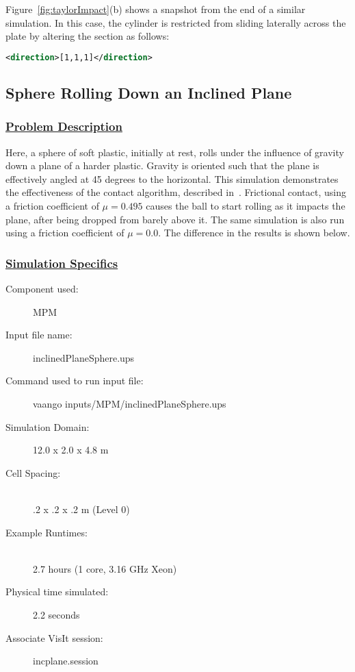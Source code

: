 Figure~\ref{fig:taylorImpact}(b) shows a snapshot from the end of a
similar simulation.  In this case, the cylinder is restricted from sliding
laterally across the plate by altering the 
section as follows:
\begin{lstlisting}[language=XML]
        <direction>[1,1,1]</direction>
\end{lstlisting}

\newpage
\subsection*{\center Sphere Rolling Down an Inclined Plane}
\subsubsection*{\underline{Problem Description}}
Here, a sphere of soft plastic, initially at rest, rolls under the
influence of gravity down a plane of a harder plastic.  Gravity is
oriented such that the plane is effectively angled at 45 degrees to
the horizontal.  This simulation demonstrates the effectiveness of
the contact algorithm, described in~\cite{Bard2001}.  Frictional
contact, using a friction coefficient of $\mu = 0.495$ causes the ball
to start rolling as it impacts the plane, after being dropped from
barely above it.  The same simulation is also run using a friction
coefficient of $\mu = 0.0$.  The difference in the results is shown
below.
 
\subsubsection*{\underline{Simulation Specifics}}
\begin{description} 
\item [Component used:] \hfill MPM
\item [Input file name:] \hfill inclinedPlaneSphere.ups
\item [Command used to run input file:]\hfill vaango inputs/MPM/inclinedPlaneSphere.ups
\item [Simulation Domain:]\hfill    12.0 x 2.0 x 4.8 m

\item [Cell Spacing:]\hfill \\ 
.2 x .2 x .2 m (Level 0)

\item [Example Runtimes:] \hfill \\
 2.7 hours  (1 core, 3.16 GHz Xeon)\\

\item [Physical time simulated:] \hfill 2.2 seconds

\item [Associate VisIt session:] \hfill incplane.session

\end{description}

